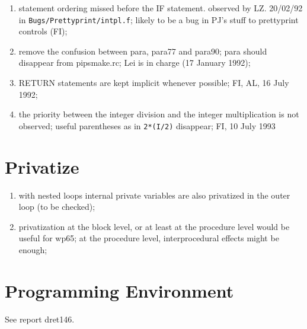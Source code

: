 \begin{enumerate}
  \item statement ordering missed before the IF statement.
        observed by LZ. 20/02/92 in \verb+Bugs/Prettyprint/intpl.f+;
        likely to be a bug in PJ's stuff to prettyprint controls (FI);

  \item remove the confusion between para, para77 and para90; para should
        disappear from pipsmake.rc; Lei is in charge (17 January 1992);

  \item RETURN statements are kept implicit whenever possible;
        FI, AL, 16 July 1992;

  \item the priority between the integer division and the integer
        multiplication is not observed; useful parentheses as in
        \verb+2*(I/2)+ disappear; FI, 10 July 1993

\end{enumerate}

\section{Privatize}

\begin{enumerate}

  \item with nested loops internal private variables are also privatized
        in the outer loop (to be checked);

  \item privatization at the block level, or at least at the procedure
        level would be useful for wp65; at the procedure level, interprocedural
        effects might be enough;

\end{enumerate}

\section{Programming Environment}

See report dret146.

